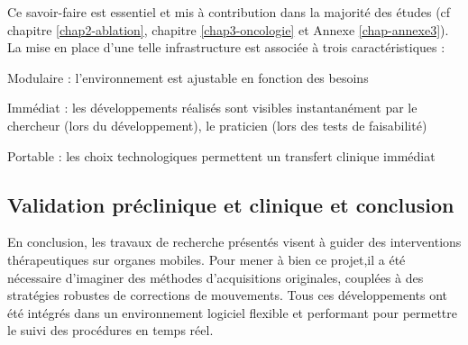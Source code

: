 
Ce savoir-faire est essentiel et mis à contribution dans la majorité des études (cf chapitre \ref{chap2-ablation}, chapitre \ref{chap3-oncologie} et Annexe \ref{chap-annexe3}). La mise en place d’une telle infrastructure est associée à trois caractéristiques :
\begin{description}
\item Modulaire : l’environnement est ajustable en fonction des besoins
\item Immédiat : les développements réalisés sont visibles instantanément par le chercheur (lors du
développement), le praticien (lors des tests de faisabilité)
\item Portable : les choix technologiques permettent un transfert clinique immédiat
\end{description}

\subsection{Validation préclinique et clinique et conclusion}
\label{chap4-conclusion}

En conclusion, les travaux de recherche présentés visent à guider des interventions thérapeutiques sur organes mobiles. Pour mener à bien ce projet,il a été nécessaire d’imaginer des méthodes d’acquisitions originales, couplées à des stratégies robustes de corrections de mouvements. Tous ces développements ont été intégrés dans un environnement logiciel flexible et performant pour permettre le suivi des procédures en temps réel.\\
